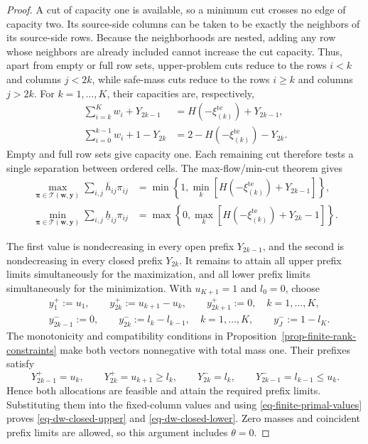 \documentclass[review,11pt,3p,authoryear,nopreprintline]{elsarticle}
\begin{document}
\begin{proof}
  A cut of capacity one is available, so a minimum cut crosses no edge of capacity two. Its source-side columns can be taken to be exactly the neighbors of its source-side rows. Because the neighborhoods are nested, adding any row whose neighbors are already included cannot increase the cut capacity. Thus, apart from empty or full row sets, upper-problem cuts reduce to the rows $i<k$ and columns $j<2k$, while safe-mass cuts reduce to the rows $i\ge k$ and columns $j>2k$. For $k=1,\ldots,K$, their capacities are, respectively,
  \begin{align*}
    \sum_{i=k}^K w_i+Y_{2k-1}
      &=H\left(-\xi_{(k)}^{\mathrm{te}}\right)+Y_{2k-1},\\
    \sum_{i=0}^{k-1}w_i+1-Y_{2k}
      &=2-H\left(-\xi_{(k)}^{\mathrm{te}}\right)-Y_{2k}.
  \end{align*}
  Empty and full row sets give capacity one. Each remaining cut therefore tests a single separation between ordered cells. The max-flow/min-cut theorem \citep{F.F56} gives
  \begin{align*}
    \max_{\bm\pi\in\mathcal T(\bm w,\bm y)}\sum_{i,j}\overline h_{ij}\pi_{ij}
      &=\min\left\{1,\min_k\left[H\left(-\xi_{(k)}^{\mathrm{te}}\right)+Y_{2k-1}\right]\right\},\\
    \min_{\bm\pi\in\mathcal T(\bm w,\bm y)}\sum_{i,j}\underline h_{ij}\pi_{ij}
      &=\max\left\{0,\max_k\left[H\left(-\xi_{(k)}^{\mathrm{te}}\right)+Y_{2k}-1\right]\right\}.
  \end{align*}

  The first value is nondecreasing in every open prefix $Y_{2k-1}$, and the second is nondecreasing in every closed prefix $Y_{2k}$. It remains to attain all upper prefix limits simultaneously for the maximization, and all lower prefix limits simultaneously for the minimization. With $u_{K+1}=1$ and $l_0=0$, choose
  \begin{align*}
    &y_1^+:=u_1,\qquad y_{2k}^+:=u_{k+1}-u_k,\qquad
      y_{2k+1}^+:=0,\quad k=1,\ldots,K,\\
    &y_{2k-1}^-:=0,\qquad y_{2k}^-:=l_k-l_{k-1},\quad k=1,\ldots,K,
      \qquad y_J^-:=1-l_K.
  \end{align*}
  The monotonicity and compatibility conditions in Proposition~\ref{prop-finite-rank-constraints} make both vectors nonnegative with total mass one. Their prefixes satisfy
  \[
    Y_{2k-1}^+=u_k,\qquad Y_{2k}^+=u_{k+1}\ge l_k,
    \qquad Y_{2k}^-=l_k,\qquad Y_{2k-1}^-=l_{k-1}\le u_k.
  \]
  Hence both allocations are feasible and attain the required prefix limits. Substituting them into the fixed-column values and using \eqref{eq-finite-primal-values} proves \eqref{eq-dw-closed-upper} and \eqref{eq-dw-closed-lower}. Zero masses and coincident prefix limits are allowed, so this argument includes $\theta=0$.


\end{proof}
\end{document}
